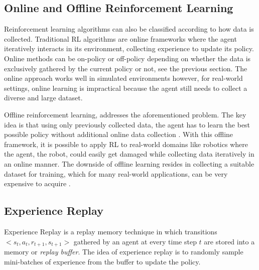 \subsection{Online and Offline Reinforcement Learning} 
\label{subsection:Online and Offline}

Reinforcement learning algorithms can also be classified according to how data is collected. Traditional RL algorithms are online frameworks where the agent iteratively interacts in its environment, collecting experience to update its policy. Online methods can be on-policy or off-policy depending on whether the data is exclusively gathered by the current policy or not, see the previous section.
The online approach works well in simulated environments however, for real-world settings, online learning is impractical because the agent still needs to collect a diverse and large dataset. 

Offline reinforcement learning, addresses the aforementioned problem. The key idea is that using only previously collected data, the agent has to learn the best possible policy without additional online data collection \cite{Offline-RL-Levine:2020}. With this offline framework, it is possible to apply RL to real-world domains like robotics where the agent, the robot, could easily get damaged while collecting data iteratively in an online manner. The downside of offline learning resides in collecting a suitable dataset for training, which for many real-world applications, can be very expensive to acquire \cite{collecting_data_for_offline_learning}.


\subsection{Experience Replay}
\label{subsection:Experience Replay}

Experience Replay is a replay memory technique in which transitions $<s_t, a_t, r_{t+1}, s_{t+1}>$ gathered by an agent at every time step $t$ are stored into a memory or \textit{replay buffer}. The idea of experience replay is to randomly sample mini-batches of experience from the buffer to update the policy. 




